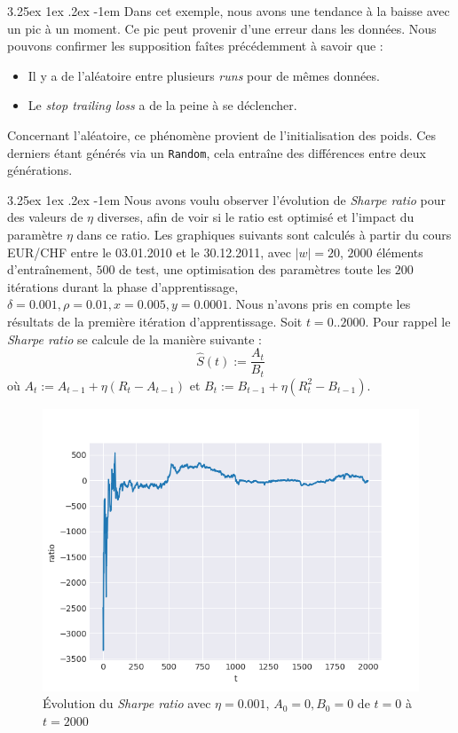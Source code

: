 \documentclass[a4paper, 11pt]{article}
\makeatletter
\renewcommand\paragraph{\@startsection{paragraph}{5}{\z@}%
  {3.25ex \@plus1ex \@minus.2ex}%
  {-1em}%
  {\normalfont\normalsize\bfseries}}
\makeatother
\begin{document}
\paragraph{}
Dans cet exemple, nous avons une tendance à la baisse avec un pic à un moment. Ce pic peut provenir d'une erreur dans les données. Nous pouvons confirmer
les supposition faîtes précédemment à savoir que :
\begin{itemize}
 \item Il y a de l'aléatoire entre plusieurs \textit{runs} pour de mêmes données.
 \item Le \textit{stop trailing loss} a de la peine à se déclencher.
\end{itemize}

Concernant l'aléatoire, ce phénomène provient de l'initialisation des poids. Ces derniers étant générés via un \texttt{Random}, cela entraîne des
différences entre deux générations.
 
 \paragraph{}
 Nous avons voulu observer l'évolution de \textit{Sharpe ratio} pour des valeurs de $\eta$ diverses, afin de voir si le ratio est optimisé et l'impact
 du paramètre $\eta$ dans ce ratio. Les graphiques suivants sont calculés à partir du cours EUR/CHF entre le 03.01.2010 et le 30.12.2011, avec 
 $|w| = 20$, $2000$ éléments d'entraînement, $500$ de test, une optimisation des
paramètres toute les $200$ itérations durant la phase d'apprentissage, $\delta = 0.001, \rho=0.01, x = 0.005, y=0.0001$. Nous n'avons pris en compte 
les résultats de la première itération d'apprentissage. Soit $t=0..2000$.
Pour rappel le \textit{Sharpe ratio} se calcule de la manière suivante :
$$\widehat{S}(t) := \frac{A_t}{B_t}$$
où $A_t := A_{t-1} + \eta (R_t - A_{t-1})$ et $B_t := B_{t-1} + \eta (R_t^2 - B_{t-1})$.


  \begin{figure}[H]
\centering
\includegraphics[]{images/res/exemple_eta_0001}
\caption[Blup]{Évolution du \textit{Sharpe ratio} avec $\eta = 0.001$, $A_0 = 0, B_0 = 0$ de $t=0$ à $t=2000$}
\end{figure}
\end{document}
